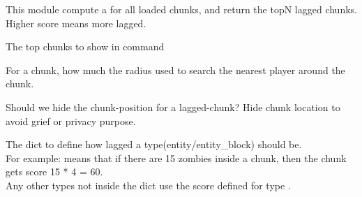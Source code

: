 This module compute a  for all loaded chunks, and return the topN lagged chunks.
Higher score means more lagged.


The top chunks to show in  command

For a chunk, how much the radius used to search the nearest player around the chunk.

Should we hide the chunk-position for a lagged-chunk?
Hide chunk location to avoid grief or privacy purpose.

The dict to define how lagged a type(entity/entity\_block) should be.\\
For example:   means that if there are 15 zombies inside a chunk,
then the chunk gets score 15 * 4 = 60.\\
Any other types not inside the dict use the score defined for type .